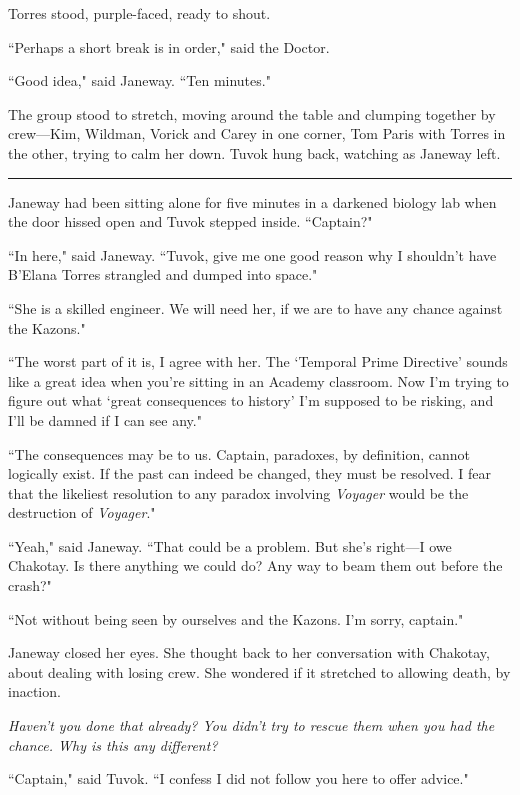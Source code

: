 \documentclass[twoside,letterpaper,12pt]{memoir}
\begin{document}
Torres stood, purple-faced, ready to shout. 

``Perhaps a short break is in order," said the Doctor. 

``Good idea," said Janeway. ``Ten minutes." 

The group stood to stretch, moving around the table and clumping together by crew---Kim, Wildman, Vorick and Carey in one corner, Tom Paris with Torres in the other, trying to calm her down. Tuvok hung back, watching as Janeway left. 

\begin{center}\rule{3cm}{0.4 pt}\end{center} 

Janeway had been sitting alone for five minutes in a darkened biology lab when the door hissed open and Tuvok stepped inside. ``Captain?" 

``In here," said Janeway. ``Tuvok, give me one good reason why I shouldn't have B'Elana Torres strangled and dumped into space." 

``She is a skilled engineer. We will need her, if we are to have any chance against the Kazons." 

``The worst part of it is, I agree with her. The `Temporal Prime Directive' sounds like a great idea when you're sitting in an Academy classroom. Now I'm trying to figure out what `great consequences to history' I'm supposed to be risking, and I'll be damned if I can see any." 

``The consequences may be to us. Captain, paradoxes, by definition, cannot logically exist. If the past can indeed be changed, they must be resolved. I fear that the likeliest resolution to any paradox involving \textit{Voyager} would be the destruction of \textit{Voyager}." 

``Yeah," said Janeway. ``That could be a problem. But she's right---I owe Chakotay. Is there anything we could do? Any way to beam them out before the crash?" 

``Not without being seen by ourselves and the Kazons. I'm sorry, captain." 

Janeway closed her eyes. She thought back to her conversation with Chakotay, about dealing with losing crew. She wondered if it stretched to allowing death, by inaction. 

\textit{Haven't you done that already? You didn't try to rescue them when you had the chance. Why is this any different?} 

``Captain," said Tuvok. ``I confess I did not follow you here to offer advice." 
\end{document}
